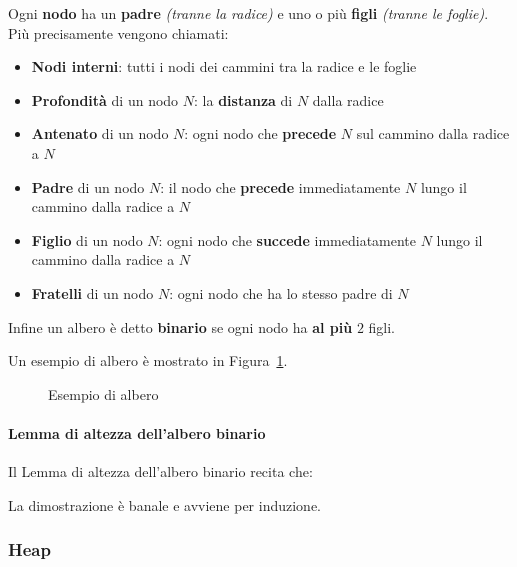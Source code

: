 \documentclass[italian, 10pt]{article}
\begin{document}
\bigskip
Ogni \textbf{nodo} ha un \textbf{padre} \textit{(tranne la radice)} e uno o più \textbf{figli} \textit{(tranne le foglie)}.
Più precisamente vengono chiamati:

\begin{itemize}
  \item \textbf{Nodi interni}: tutti i nodi dei cammini tra la radice e le foglie
  \item \textbf{Profondità} di un nodo \(N\): la \textbf{distanza} di \(N\) dalla radice
  \item \textbf{Antenato} di un nodo \(N\):  ogni nodo che \textbf{precede} \(N\) sul cammino dalla radice a \(N\)
  \item \textbf{Padre} di un nodo \(N\): il nodo che \textbf{precede} immediatamente \(N\) lungo il cammino dalla radice a \(N\)
  \item \textbf{Figlio} di un nodo \(N\): ogni nodo che \textbf{succede} immediatamente \(N\) lungo il cammino dalla radice a \(N\)
  \item \textbf{Fratelli} di un nodo \(N\): ogni nodo che ha lo stesso padre di \(N\)
\end{itemize}

Infine un albero è detto \textbf{binario} se ogni nodo ha \textbf{al più} \(2\) figli.

\bigskip
Un esempio di albero è mostrato in Figura~\ref{fig:esempio-di-albero}.

\begin{figure}[htbp]
  \bigskip
  \centering
  \caption{Esempio di albero}
  \label{fig:esempio-di-albero}
  \bigskip
\end{figure}

\paragraph{Lemma di altezza dell'albero binario}
\label{par:lemma-altezza-albero-binario}

Il Lemma di altezza dell'albero binario recita che:


La dimostrazione è banale e avviene per induzione.

\subsubsection{Heap}
\label{sec:heap}
\end{document}
